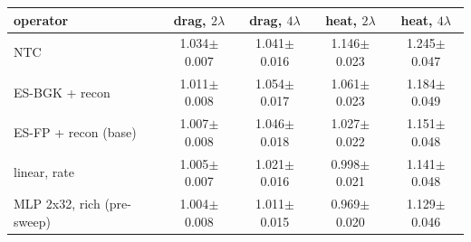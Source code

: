 \begin{tabular}{@{}lcccc@{}}
\toprule
operator & drag, $2\lambda$ & drag, $4\lambda$ & heat, $2\lambda$ & heat, $4\lambda$ \\
\midrule
NTC & 1.034$\pm$0.007 & 1.041$\pm$0.016 & 1.146$\pm$0.023 & 1.245$\pm$0.047 \\
ES-BGK + recon & 1.011$\pm$0.008 & 1.054$\pm$0.017 & 1.061$\pm$0.023 & 1.184$\pm$0.049 \\
ES-FP + recon (base) & 1.007$\pm$0.008 & 1.046$\pm$0.018 & 1.027$\pm$0.022 & 1.151$\pm$0.048 \\
linear, rate & 1.005$\pm$0.007 & 1.021$\pm$0.016 & 0.998$\pm$0.021 & 1.141$\pm$0.048 \\
MLP 2x32, rich (pre-sweep) & 1.004$\pm$0.008 & 1.011$\pm$0.015 & 0.969$\pm$0.020 & 1.129$\pm$0.046 \\
\bottomrule
\end{tabular}
